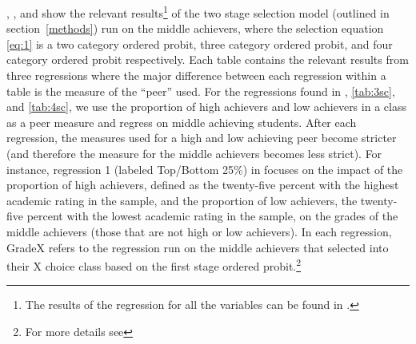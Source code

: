 , , and  show the relevant results\footnote{The results of the regression for all the variables can be found in .} of the two stage selection model (outlined in section~\ref{methods}) run on the middle achievers, where the selection equation \eqref{eq:1} is a two category ordered probit, three category ordered probit, and four category ordered probit respectively. 
Each table contains the relevant results from three regressions where the major difference between each regression within a table is the measure of the ``peer'' used. 
For the regressions found in , \ref{tab:3sc}, and \ref{tab:4sc}, we use the proportion of high achievers and low achievers in a class as a peer measure and regress on middle achieving students. 
After each regression, the measures used for a high and low achieving peer become stricter (and therefore the measure for the middle achievers becomes less strict). 
For instance, regression 1 (labeled Top/Bottom 25\%) in  focuses on the impact of the proportion of high achievers, defined as the twenty-five percent with the highest academic rating in the sample, and the proportion of low achievers, the twenty-five percent with the lowest academic rating in the sample, on the grades of the middle achievers (those that are not high or low achievers). 
In each regression, GradeX refers to the regression run on the middle achievers that selected into their X choice class based on the first stage ordered probit.\footnote{For more details see } 

\clearpage{}

